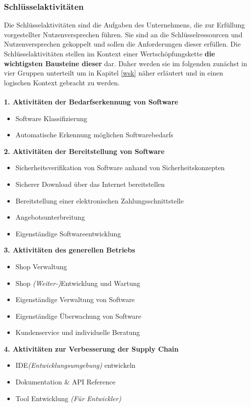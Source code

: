 \subsubsection{Schlüsselaktivitäten}\label{key_activities}
Die Schlüsselaktivitäten sind die Aufgaben des Unternehmens, die zur Erfüllung vorgestellter Nutzenversprechen führen. Sie sind an die Schlüsselressourcen und Nutzenversprechen gekoppelt und sollen die Anforderungen dieser erfüllen. Die Schlüsselaktivitäten stellen im Kontext einer Wertschöpfungskette \textbf{die wichtigsten Bausteine dieser} dar. Daher werden sie im folgenden zunächst in vier Gruppen unterteilt um in Kapitel \ref{wsk} näher erläutert und in einen logischen Kontext gebracht zu werden.\\\\
\textbf{1. Aktivitäten der Bedarfserkennung von Software}
\begin{itemize}
	\item Software Klassifizierung
	\item Automatische Erkennung möglichen Softwarebedarfs
\end{itemize}
\vspace{0.2cm}
\textbf{2. Aktivitäten der Bereitstellung von Software}
\begin{itemize}
	\item Sicherheitsverifikation von Software anhand von Sicherheitskonzepten
	\item Sicherer Download über das Internet bereitstellen
	\item Bereitstellung einer elektronischen Zahlungsschnittstelle
	\item Angebotsunterbreitung
	\item Eigenständige Softwareentwicklung
\end{itemize}
\vspace{0.2cm}
\textbf{3. Aktivitäten des generellen Betriebs}
\begin{itemize}
	\item Shop Verwaltung
	\item Shop \textit{(Weiter-)}Entwicklung und Wartung
	\item Eigenständige Verwaltung von Software
	\item Eigenständige Überwachung von Software
	\item Kundenservice und individuelle Beratung
\end{itemize}
\vspace{0.2cm}
\textbf{4. Aktivitäten zur Verbesserung der Supply Chain}
\begin{itemize}
	\item IDE\textit{(Entwicklungsumgebung)} entwickeln
	\item Dokumentation \& API Reference
	\item Tool Entwicklung \textit{(Für Entwickler)}
\end{itemize}

